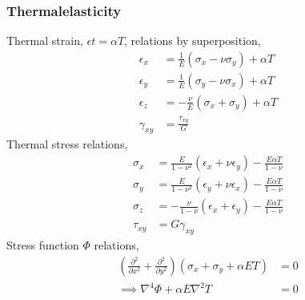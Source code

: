 \subsubsection*{Thermalelasticity}
Thermal strain, $\epsilon{t} = \alpha T$, relations by superposition,
\begin{align*}
    \epsilon_x &= \frac{1}{E} \left( \sigma_x - \nu \sigma_y \right) + \alpha T \\
    \epsilon_y &= \frac{1}{E} \left( \sigma_y - \nu \sigma_x \right) + \alpha T \\
    \epsilon_z &= -\frac{\nu}{E} \left( \sigma_x + \sigma_y \right) + \alpha T \\
    \gamma_{xy} &= \frac{\tau_{xy}}{G} 
\end{align*}
Thermal stress relations,
\begin{align*}
    \sigma_x &= \frac{E}{1-\nu^2} \left( \epsilon_x + \nu \epsilon_y \right) - \frac{E\alpha T}{1-\nu} \\
    \sigma_y &= \frac{E}{1-\nu^2} \left( \epsilon_y + \nu \epsilon_x \right) - \frac{E\alpha T}{1-\nu} \\
    \sigma_z &= -\frac{\nu}{1-\nu} \left( \epsilon_x + \epsilon_y \right) - \frac{E\alpha T}{1-\nu} \\
    \tau_{xy} &= G \gamma_{xy} 
\end{align*}
Stress function $\Phi$ relations,
\begin{align*}
    \left(\frac{\partial^2}{\partial x^2} + \frac{\partial^2}{\partial y^2} \right)(\sigma_x + \sigma_y + \alpha ET) &= 0 \\
    \implies \nabla^4 \Phi + \alpha E \nabla^2 T &= 0 
\end{align*}
